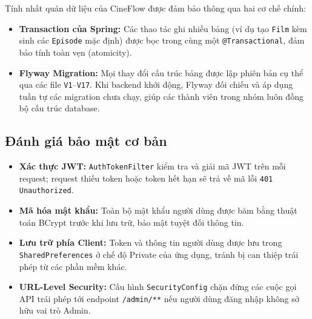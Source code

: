 Tính nhất quán dữ liệu của CineFlow được đảm bảo thông qua hai cơ chế chính:
\begin{itemize}
    \item \textbf{Transaction của Spring:} Các thao tác ghi nhiều bảng (ví dụ tạo \texttt{Film} kèm sinh các \texttt{Episode} mặc định) được bọc trong cùng một \texttt{@Transactional}, đảm bảo tính toàn vẹn (atomicity).
    \item \textbf{Flyway Migration:} Mọi thay đổi cấu trúc bảng được lập phiên bản cụ thể qua các file \texttt{V1}--\texttt{V17}. Khi backend khởi động, Flyway đối chiếu và áp dụng tuần tự các migration chưa chạy, giúp các thành viên trong nhóm luôn đồng bộ cấu trúc database.
\end{itemize}

\subsection{Đánh giá bảo mật cơ bản}
\label{subsec:danh_gia_bao_mat}

\begin{itemize}
    \item \textbf{Xác thực JWT:} \texttt{AuthTokenFilter} kiểm tra và giải mã JWT trên mỗi request; request thiếu token hoặc token hết hạn sẽ trả về mã lỗi \texttt{401 Unauthorized}.
    \item \textbf{Mã hóa mật khẩu:} Toàn bộ mật khẩu người dùng được băm bằng thuật toán BCrypt trước khi lưu trữ, bảo mật tuyệt đối thông tin.
    \item \textbf{Lưu trữ phía Client:} Token và thông tin người dùng được lưu trong \texttt{SharedPreferences} ở chế độ Private của ứng dụng, tránh bị can thiệp trái phép từ các phần mềm khác.
    \item \textbf{URL-Level Security:} Cấu hình \texttt{SecurityConfig} chặn đứng các cuộc gọi API trái phép tới endpoint \texttt{/admin/**} nếu người dùng đăng nhập không sở hữu vai trò Admin.
\end{itemize}

